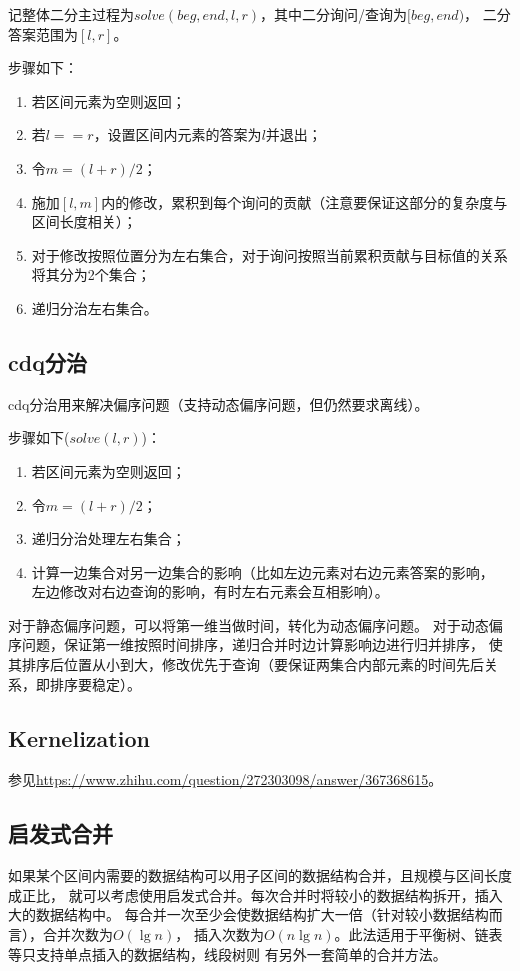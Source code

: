 记整体二分主过程为$solve(beg,end,l,r)$，其中二分询问/查询为$[beg,end)$，
二分答案范围为$[l,r]$。

步骤如下：
\begin{enumerate}
	\item 若区间元素为空则返回；
	\item 若$l==r$，设置区间内元素的答案为$l$并退出；
	\item 令$m=(l+r)/2$；
	\item 施加$[l,m]$内的修改，累积到每个询问的贡献（注意要保证这部分的复杂度与
	      区间长度相关）；
	\item 对于修改按照位置分为左右集合，对于询问按照当前累积贡献与目标值的关系
	      将其分为2个集合；
	\item 递归分治左右集合。
\end{enumerate}
\subsection{cdq分治}\label{CDQ}
cdq分治用来解决偏序问题（支持动态偏序问题，但仍然要求离线）。

步骤如下($solve(l,r)$)：
\begin{enumerate}
	\item 若区间元素为空则返回；
	\item 令$m=(l+r)/2$；
	\item 递归分治处理左右集合；
	\item 计算一边集合对另一边集合的影响（比如左边元素对右边元素答案的影响，
	      左边修改对右边查询的影响，有时左右元素会互相影响）。
\end{enumerate}

对于静态偏序问题，可以将第一维当做时间，转化为动态偏序问题。
对于动态偏序问题，保证第一维按照时间排序，递归合并时边计算影响边进行归并排序，
使其排序后位置从小到大，修改优先于查询（要保证两集合内部元素的时间先后关系，即排序要稳定）。
\subsection{Kernelization}
参见\url{https://www.zhihu.com/question/272303098/answer/367368615}。
\subsection{启发式合并}
如果某个区间内需要的数据结构可以用子区间的数据结构合并，且规模与区间长度成正比，
就可以考虑使用启发式合并。每次合并时将较小的数据结构拆开，插入大的数据结构中。
每合并一次至少会使数据结构扩大一倍（针对较小数据结构而言），合并次数为$O(\lg n)$，
插入次数为$O(n\lg n)$。此法适用于平衡树、链表等只支持单点插入的数据结构，线段树则
有另外一套简单的合并方法。
